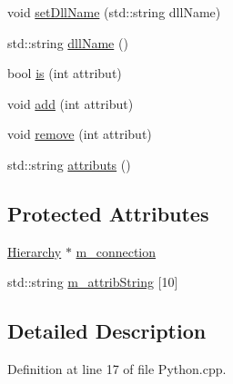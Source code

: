 \begin{DoxyCompactItemize}
void \hyperlink{classObject_a870c5af919958c2136623b2d7816d123}{setDllName} (std::string dllName)
\item 
std::string \hyperlink{classObject_a2e3947f2870094c332d7454117f3ec63}{dllName} ()
\item 
bool \hyperlink{classAttrib_a704f26af560909ad22065083bb7d4c34}{is} (int attribut)
\item 
void \hyperlink{classAttrib_a235f773af19c900264a190b00a3b4ad7}{add} (int attribut)
\item 
void \hyperlink{classAttrib_a7d4ef7e32d93cb287792b87b857e79f3}{remove} (int attribut)
\item 
std::string \hyperlink{classAttrib_aee7bbf16b144887f196e1341b24f8a26}{attributs} ()
\end{DoxyCompactItemize}
\subsection*{Protected Attributes}
\begin{DoxyCompactItemize}
\item 
\hyperlink{classHierarchy}{Hierarchy} $\ast$ \hyperlink{classElement_abe3de7a5dbbc9a6dd2d7e012e5fdb266}{m\_\-connection}
\item 
std::string \hyperlink{classAttrib_a3414521d7a82476e874b25a5407b5e63}{m\_\-attribString} \mbox{[}10\mbox{]}
\end{DoxyCompactItemize}


\subsection{Detailed Description}


Definition at line 17 of file Python.cpp.

